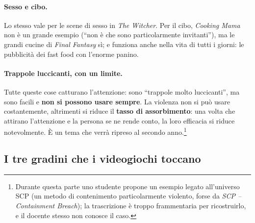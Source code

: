\paragraph{Sesso e cibo.} Lo stesso vale per le scene di sesso in \emph{The Witcher}.
Per il cibo, \emph{Cooking Mama} non è un grande esempio (``non è che sono
particolarmente invitanti''), ma le grandi cucine di \emph{Final Fantasy} sì; e
funziona anche nella vita di tutti i giorni: le pubblicità dei fast food con
l'enorme panino.

\paragraph{Trappole luccicanti, con un limite.} Tutte queste cose catturano
l'attenzione: sono ``trappole molto luccicanti'', ma sono facili e \textbf{non si
possono usare sempre}. La violenza non si può usare costantemente, altrimenti si
riduce il \textbf{tasso di assorbimento}: una volta che attirano l'attenzione e la
persona se ne rende conto, la loro efficacia si riduce notevolmente. È un tema che
verrà ripreso al secondo anno.\footnote{Durante questa parte uno studente propone un
esempio legato all'universo SCP (un metodo di contenimento particolarmente violento,
forse da \emph{SCP -- Containment Breach}); la trascrizione è troppo frammentaria per
ricostruirlo, e il docente stesso non conosce il caso.}

\subsection{I tre gradini che i videogiochi toccano}

